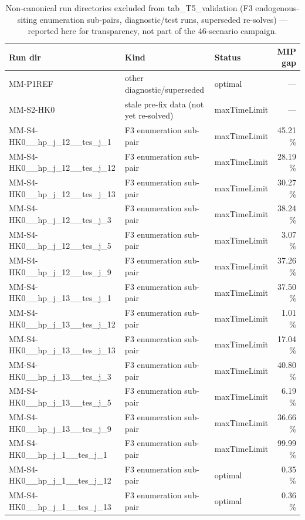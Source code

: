 \begin{table}[htbp]
  \centering
  \caption{Non-canonical run directories excluded from tab\_T5\_validation (F3 endogenous-siting enumeration sub-pairs, diagnostic/test runs, superseded re-solves) — reported here for transparency, not part of the 46-scenario campaign.}
  \label{tab:t5_supplement_excluded}
  \begin{tabular}{lllr}
  \toprule
  Run dir & Kind & Status & MIP gap \\
  \midrule
  MM-P1REF & other diagnostic/superseded & optimal & — \\
  MM-S2-HK0 & stale pre-fix data (not yet re-solved) & maxTimeLimit & — \\
  MM-S4-HK0\_\_hp\_j\_12\_\_tes\_j\_1 & F3 enumeration sub-pair & maxTimeLimit & 45.21 \% \\
  MM-S4-HK0\_\_hp\_j\_12\_\_tes\_j\_12 & F3 enumeration sub-pair & maxTimeLimit & 28.19 \% \\
  MM-S4-HK0\_\_hp\_j\_12\_\_tes\_j\_13 & F3 enumeration sub-pair & maxTimeLimit & 30.27 \% \\
  MM-S4-HK0\_\_hp\_j\_12\_\_tes\_j\_3 & F3 enumeration sub-pair & maxTimeLimit & 38.24 \% \\
  MM-S4-HK0\_\_hp\_j\_12\_\_tes\_j\_5 & F3 enumeration sub-pair & maxTimeLimit & 3.07 \% \\
  MM-S4-HK0\_\_hp\_j\_12\_\_tes\_j\_9 & F3 enumeration sub-pair & maxTimeLimit & 37.26 \% \\
  MM-S4-HK0\_\_hp\_j\_13\_\_tes\_j\_1 & F3 enumeration sub-pair & maxTimeLimit & 37.50 \% \\
  MM-S4-HK0\_\_hp\_j\_13\_\_tes\_j\_12 & F3 enumeration sub-pair & maxTimeLimit & 1.01 \% \\
  MM-S4-HK0\_\_hp\_j\_13\_\_tes\_j\_13 & F3 enumeration sub-pair & maxTimeLimit & 17.04 \% \\
  MM-S4-HK0\_\_hp\_j\_13\_\_tes\_j\_3 & F3 enumeration sub-pair & maxTimeLimit & 40.80 \% \\
  MM-S4-HK0\_\_hp\_j\_13\_\_tes\_j\_5 & F3 enumeration sub-pair & maxTimeLimit & 6.19 \% \\
  MM-S4-HK0\_\_hp\_j\_13\_\_tes\_j\_9 & F3 enumeration sub-pair & maxTimeLimit & 36.66 \% \\
  MM-S4-HK0\_\_hp\_j\_1\_\_tes\_j\_1 & F3 enumeration sub-pair & maxTimeLimit & 99.99 \% \\
  MM-S4-HK0\_\_hp\_j\_1\_\_tes\_j\_12 & F3 enumeration sub-pair & optimal & 0.35 \% \\
  MM-S4-HK0\_\_hp\_j\_1\_\_tes\_j\_13 & F3 enumeration sub-pair & optimal & 0.36 \% \\

\end{tabular}
\end{table}
